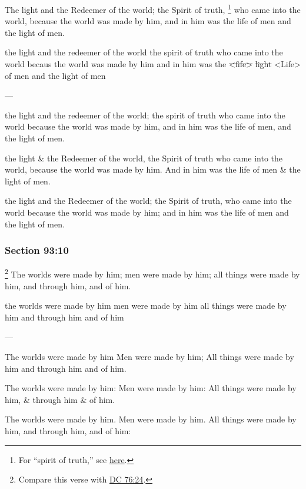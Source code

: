 		The light and the Redeemer of the world; the Spirit of truth,%
			\footnote{%
				For ``spirit of truth,'' see \hyperref[SPIRIT-PHRASES]{here}.
				}
		who came into the world, because the world was made by him, and in him was the life of men and the light of men.

		\begin{framed}
		\scriptsize
			\begin{compactdesc}
				\item[JSP] the light and the redeemer of the world the spirit of truth who came into the world becaus the world was made by him and in him was the \sout{<fife>} \sout{light} <Life> of men and the light of men
				\item[BC] ---
				\item[RB2] the light and the redeemer of the world; the spirit of truth who came into the world because the world was made by him, and in him was the life of men, and the light of men. 
				\item[RB1] the light \& the Redeemer of the world, the Spirit of truth who came into the world, because the world was made by him. And in him was the life of men \& the light of men. 
				\item[DC 1835] the light and the Redeemer of the world; the Spirit of truth, who came into the world because the world was made by him; and in him was the life of men and the light of men. 
			\end{compactdesc}
		\end{framed}

	\subsubsection{Section 93:10} %
		\label{DC93-10}

			\footnote{%
				Compare this verse with \hyperref[DC76-24]{DC 76:24}.
				}%
		The worlds were made by him; men were made by him; all things were made by him, and through him, and of him.

		\begin{framed}
		\scriptsize
			\begin{compactdesc}
				\item[JSP] the worlds were made by him men were made by him all things were made by him and through him and of him
				\item[BC] ---
				\item[RB2] The worlds were made by him Men were made by him; All things were made by him and through him and of him.
				\item[RB1] The worlds were made by him: Men were made by him: All things were made by him, \& through him \& of him. 
				\item[DC 1835] The worlds were made by him. Men were made by him. All things were made by him, and through him, and of him: 
			\end{compactdesc}
		\end{framed}

